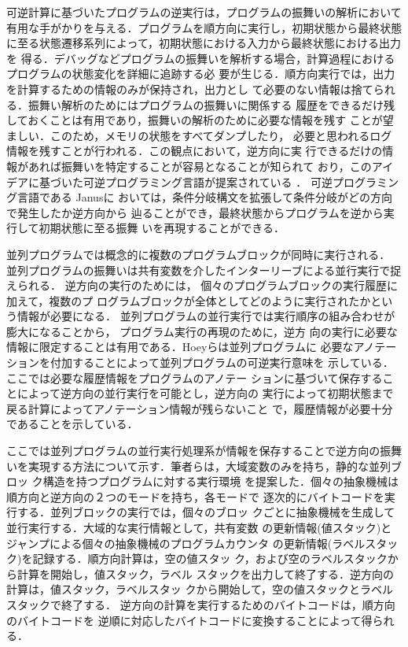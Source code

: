 \documentclass[submit,PRO]{ipsj}
\begin{document}
可逆計算に基づいたプログラムの逆実行は，プログラムの振舞いの解析において
有用な手がかりを与える．プログラムを順方向に実行し，初期状態から最終状態
に至る状態遷移系列によって，初期状態における入力から最終状態における出力を
得る．デバッグなどプログラムの振舞いを解析する場合，計算過程における
プログラムの状態変化を詳細に追跡する必
要が生じる．順方向実行では，出力を計算するための情報のみが保持され，出力とし
て必要のない情報は捨てられる．振舞い解析のためにはプログラムの振舞いに関係する
履歴をできるだけ残しておくことは有用であり，振舞いの解析のために必要な情報を残す
ことが望ましい．このため，メモリの状態をすべてダンプしたり，
必要と思われるログ情報を残すことが行われる．この観点において，逆方向に実
行できるだけの情報があれば振舞いを特定することが容易となることが知られて
おり，このアイデアに基づいた可逆プログラミング言語が提案されている
\cite{DBLP:journals/entcs/Yokoyama10,DBLP:conf/ifl/ThomsenA15}．
可逆プログラミング言語である
%
Janusに
おいては，条件分岐構文を拡張して条件分岐がどの方向で発生したか逆方向から
辿ることができ，最終状態からプログラムを逆から実行して初期状態に至る振舞
いを再現することができる．%

並列プログラムでは概念的に複数のプログラムブロックが同時に実行される．
並列プログラムの振舞いは共有変数を介したインターリーブによる並行実行で捉
えられる．%
逆方向の実行のためには，
%
個々のプログラムブロックの実行履歴に加えて，複数のプ
ログラムブロックが全体としてどのように実行されたかという情報が必要になる．
並列プログラムの並行実行では実行順序の組み合わせが膨大になることから，
プログラム実行の再現のために，逆方
向の実行に必要な情報に限定することは有用である．Hoeyらは並列プログラムに
必要なアノテーションを付加することによって並列プログラムの可逆実行意味を
示している\cite{DBLP:journals/corr/abs-1808-08651,Hoey20PHD}．
ここでは必要な履歴情報をプログラムのアノテー
ションに基づいて保存することによって逆方向の並行実行を可能とし，逆方向の
実行によって初期状態まで戻る計算によってアノテーション情報が残らないこと
で，履歴情報が必要十分であることを示している．

ここでは並列プログラムの並行実行処理系が情報を保存することで逆方向の振舞
いを実現する方法について示す．筆者らは，大域変数のみを持ち，静的な並列ブロッ
ク構造を持つプログラムに対する実行環境
を提案した\cite{DBLP:conf/rc/IkedaY20}．個々の抽象機械は%
順方向と逆方向の２つのモードを持ち，各モードで%
逐次的にバイトコードを実行する．並列ブロックの実行では，個々のブロッ
クごとに抽象機械を生成して並行実行する．大域的な実行情報として，共有変数
の更新情報(値スタック)とジャンプによる個々の抽象機械のプログラムカウンタ
の更新情報(ラベルスタック)を記録する．順方向計算は，空の値スタッ
ク，および空のラベルスタックから計算を開始し，値スタック，ラベル
スタックを出力して終了する．逆方向の計算は，値スタック，ラベルスタッ
クから開始して，空の値スタックとラベルスタックで終了する．
逆方向の計算を実行するためのバイトコードは，順方向のバイトコードを
逆順に対応したバイトコードに変換することによって得られる．
\end{document}
